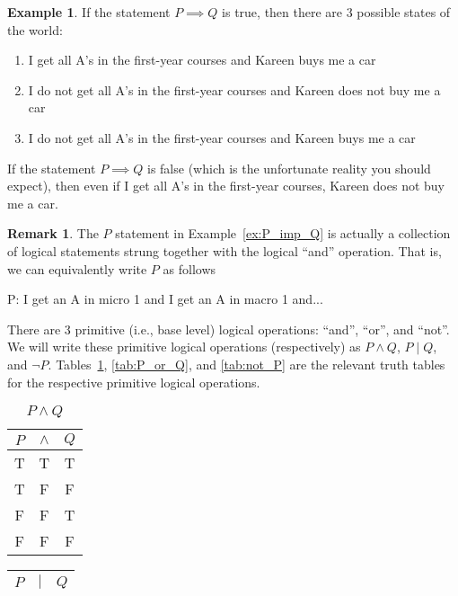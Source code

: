 \documentclass{article}
\theoremstyle{definition}
\newtheorem{remark}{Remark}
\newtheorem{ex}{Example}
\begin{document}
\begin{itemize}
\begin{ex}
        If the statement $P\implies Q$ is true, then there are 3 possible states of the world:
        \begin{enumerate}
            \item I get all A's in the first-year courses and Kareen buys me a car
            \item I do not get all A's in the first-year courses and Kareen does not buy me a car
            \item I do not get all A's in the first-year courses and Kareen buys me a car
        \end{enumerate}
        If the statement $P\implies Q$ is false (which is the unfortunate reality you should expect), then even if I get all A's in the first-year courses, Kareen does not buy me a car. 
    \end{ex}
    \begin{remark}
        The $P$ statement in Example~\ref{ex:P_imp_Q} is actually a collection of logical statements strung together with the logical ``and'' operation. That is, we can equivalently write $P$ as follows
        \begin{center}
            P: I get an A in micro 1 and I get an A in macro 1 and...
        \end{center}
        There are 3 primitive (i.e., base level) logical operations: ``and'', ``or'', and ``not''. We will write these primitive logical operations (respectively) as $P \wedge Q$, $P \mid Q$, and $\neg P$. Tables~\ref{tab:P_and_Q}, \ref{tab:P_or_Q}, and \ref{tab:not_P} are the relevant truth tables for the respective primitive logical operations. 
        \begin{table}[ht]
        \centering
        \begin{tabular}{c c c}
             $P$ & \color{blue}$\wedge$ & $Q$\\\hline
             T & \color{blue}T & T \\
             T & \color{blue}F & F \\
             F & \color{blue}F & T \\
             F & \color{blue}F & F \\
        \end{tabular}
        \caption{$P\wedge Q$}
        \label{tab:P_and_Q}
    \end{table}
    \begin{table}[ht]
        \centering
        \begin{tabular}{c c c}
             $P$ & \color{blue}$\mid$\color{black} & $Q$\\\hline

\end{tabular}
\end{table}
\end{remark}
\end{itemize}
\end{document}
